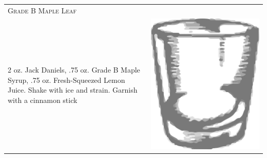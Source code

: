 \documentclass{article}
\begin{document}
\begin{multicols}{2}
\begin{tabular}{p{2in} p{0.5in}}
\multicolumn{2}{p{3in}}{\centering\Huge\textsc{Grade B Maple Leaf}} \\ 
  \vspace{-0.1in}2 oz. Jack Daniels, .75 oz. Grade B Maple Syrup, .75 oz. Fresh-Squeezed Lemon Juice. Shake with ice and strain.  Garnish with a cinnamon stick &
  \vspace{-0.1in} \includegraphics{rocks_glass.png}
\end{tabular}


\end{multicols}
\end{document}
